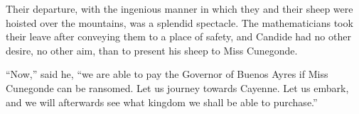Their departure, with the ingenious manner in which they and their sheep were hoisted over the mountains, was a splendid spectacle. The mathematicians took their leave after conveying them to a place of safety, and Candide had no other desire, no other aim, than to present his sheep to Miss Cunegonde.

``Now,'' said he, ``we are able to pay the Governor of Buenos Ayres if Miss Cunegonde can be ransomed. Let us journey towards Cayenne. Let us embark, and we will afterwards see what kingdom we shall be able to purchase.''

